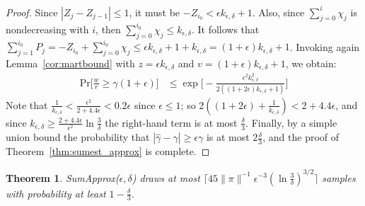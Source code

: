 \documentclass[a4paper,11pt]{article}
\newcommand{\prob}{\text{Pr}}
\newcommand{\sumest}{SumApprox}
\newcommand{\kerr}{k_{\epsilon,\delta}}
\newtheorem{theorem}{Theorem}
\begin{document}
\begin{proof}
Since $|Z_j - Z_{j-1}| \le 1$, it must be $-Z_{i_0} < \epsilon k_{\epsilon,\delta}+1$.
Also, since $\sum_{j=0}^i \chi_j$ is nondecreasing with $i$, then $\sum_{j=0}^{i_0} \chi_j \le k_{\epsilon,\delta}$.
It follows that $\sum_{j=1}^{i_0} P_j = -Z_{i_0} + \sum_{j=0}^{i_0} \chi_j \le \epsilon k_{\epsilon,\delta} + 1 + k_{\epsilon,\delta} = (1+\epsilon)k_{\epsilon,\delta}+1$.
Invoking again Lemma~\ref{cor:martbound} with $z=\epsilon k_{\epsilon,\delta}$ and $v=(1+\epsilon)k_{\epsilon,\delta}+1$, we obtain:
\begin{align}
\prob\big[\frac{w}{r} \ge \gamma(1+\epsilon)\big] 
&\le \exp{\!\Big[\!-\frac{\epsilon^2 k_{\epsilon,\delta}^2}{2((1+2\epsilon)k_{\epsilon,\delta}+1)}\Big]}
\end{align}
Note that $\frac{1}{\kerr} < \frac{\epsilon^2}{2+4.4\epsilon} < 0.2\epsilon$ since $\epsilon \le 1$; so $2((1+2\epsilon)+\frac{1}{\kerr}) < 2+4.4\epsilon$, and since $\kerr \ge \frac{2+4.4\epsilon}{\epsilon^2}\ln{\!\frac{3}{\delta}}$ the right-hand term is at most $\frac{\delta}{3}$.
Finally, by a simple union bound the probability that $|\hat{\gamma} - \gamma| \ge \epsilon \gamma$  is at most $2\frac{\delta}{3}$, and the proof of Theorem~\ref{thm:sumest_approx} is complete.
\end{proof}
\begin{theorem}
\label{thm:sumest_cost}
\sumest($\epsilon,\delta$) draws at most
$\lceil 45 \|\pi\|^{-1} \epsilon^{-3}(\ln{\frac{3}{\delta}})^{3/2} \rceil$ samples with probability at least $1-\frac{\delta}{3}$.
\end{theorem}
\end{document}
